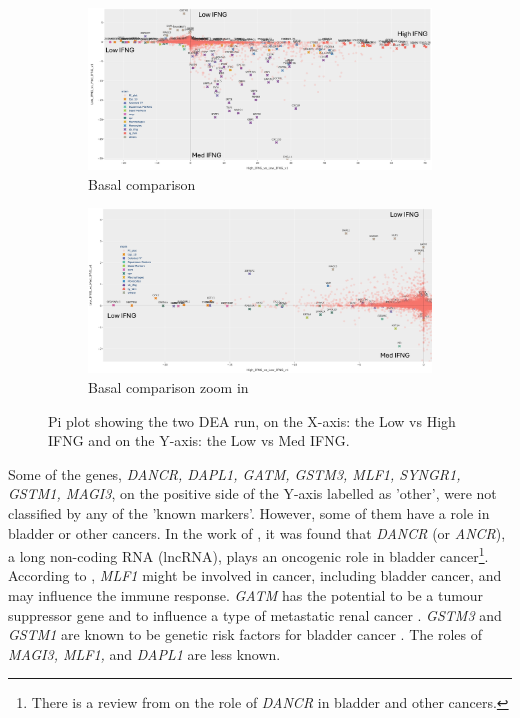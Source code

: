 \begin{figure}[!htb]
    \centering
    \begin{subfigure}[!t]{1.0\textwidth}
        \includegraphics[width=\textwidth,keepaspectratio]{Sections/ClusteringAnalysis/Resources/discussion/basal_comp_pi.png}    
        \caption{Basal comparison}
        \label{fig:cs:basal_comp}
    \end{subfigure}
    \centering
    \begin{subfigure}[!t]{1.0\textwidth}
        \includegraphics[width=\textwidth, keepaspectratio]{Sections/ClusteringAnalysis/Resources/discussion/basal_comp_pi_zoom.png}
        \caption{Basal comparison zoom in}
        \label{fig:cs:basal_comp_zoom}
    \end{subfigure} 
    \centering
    \caption{Pi plot showing the two DEA run, on the X-axis: the Low vs High IFNG and on the Y-axis: the Low vs Med IFNG.} 
    \label{fig:cs:pi_basal}
\end{figure}


Some of the genes, \textit{DANCR, DAPL1, GATM, GSTM3, MLF1, SYNGR1, GSTM1, MAGI3}, on the positive side of the Y-axis labelled as 'other', were not classified by any of the 'known markers'. However, some of them have a role in bladder or other cancers. In the work of \citet{Zhan2018-um}, it was found that \textit{DANCR} (or \textit{ANCR}), a long non-coding RNA (lncRNA), plays an oncogenic role in bladder cancer\footnote{There is a review from \citet{Wang2021-gn} on the role of \textit{DANCR} in bladder and other cancers.}. According to \citet{Li2023-mk}, \textit{MLF1} might be involved in cancer, including bladder cancer, and may influence the immune response. \textit{GATM} has the potential to be a tumour suppressor gene and to influence a type of metastatic renal cancer \citet{Jee2022-wi}. \textit{GSTM3} and \textit{GSTM1} are known to be genetic risk factors for bladder cancer \citet{Schnakenberg2000-cu}. The roles of \textit{MAGI3, MLF1,} and \textit{DAPL1} are less known.

